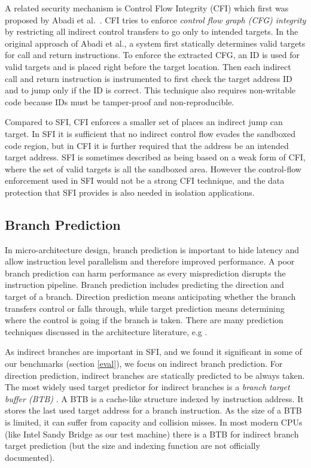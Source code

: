 \documentclass[conference]{IEEEtran}
\begin{document}
A related security mechanism  is Control Flow Integrity (CFI) which first was proposed  by Abadi et al.~\cite{abadiCFI}. CFI tries to enforce \textit{control flow graph  (CFG) integrity} by restricting all indirect control transfers to go only to intended targets. In the original approach of Abadi et al., a system first statically determines valid targets for call and return instructions. To enforce the extracted CFG, an ID is used for valid targets and is placed right before the target location. Then each indirect call and return instruction is instrumented to first check the target address ID and to jump only if the ID is correct. %
 This technique also requires non-writable code because IDs must be tamper-proof and non-reproducible.

Compared to SFI, CFI enforces a smaller set of places an indirect jump can target. In SFI it is sufficient that no indirect control flow evades the sandboxed code region, but in CFI it is further required that the address be an intended target address. SFI is sometimes described as being based on a weak form of CFI, where the set of valid targets is all the sandboxed area. However the control-flow enforcement used in SFI would not be a strong CFI technique, and the data protection that SFI provides is also needed in isolation applications.


\subsection{Branch Prediction}
In micro-architecture design, branch prediction is important to hide latency and allow instruction level parallelism and therefore improved performance. A poor branch prediction can harm performance as every  misprediction disrupts the  instruction pipeline.  Branch prediction includes predicting the direction and target of a branch. Direction prediction means anticipating whether the branch transfers control or falls through, while target prediction means determining where the control is going if the branch is taken. There are many prediction techniques discussed in the architecture literature, e.g \cite{ertlOpt, hennessyComputer, thangarajanSurvey}.

As  indirect branches are important in SFI, and we found it significant in some of our benchmarks (section \ref{eval}), we focus on indirect branch prediction. For direction prediction, indirect branches are statically predicted to be always taken. The most widely used target predictor for indirect branches is a \textit{branch target buffer (BTB)} \cite{ertlOpt}. A BTB is a cache-like structure indexed by  instruction  address. It stores the last used target address for a branch instruction. As the size of a BTB is limited, it can suffer from capacity and collision misses. In most modern CPUs (like Intel Sandy Bridge as our test machine) there is a   BTB for indirect branch target prediction (but the size and indexing function are not officially documented).
\end{document}
